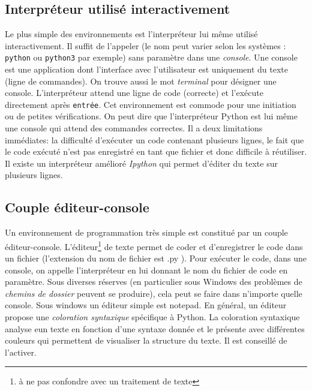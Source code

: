 \subsection{Interpréteur utilisé interactivement}
Le plus simple des environnements est l'interpréteur lui même utilisé interactivement. Il suffit de l'appeler (le nom peut varier selon les systèmes : \texttt{python} ou \texttt{python3} par exemple) sans paramètre dans une \emph{console}. Une console est une application dont l'interface avec l'utilisateur est uniquement du texte (ligne de commandes). On trouve aussi le mot \emph{terminal} pour désigner une console.\newline
L'interpréteur attend une ligne de code (correcte) et l'exécute directement après \texttt{entrée}. Cet environnement est commode pour une initiation ou de petites vérifications. 
On peut dire que l'interpréteur Python est lui même une console qui attend des commandes correctes.
Il a deux limitations immédiates: la difficulté d'exécuter un code contenant plusieurs lignes, le fait que le code exécuté n'est pas enregistré en tant que fichier et donc difficile à réutiliser. Il existe un interpréteur amélioré \emph{Ipython} qui permet d'éditer du texte sur plusieurs lignes.

\subsection{Couple éditeur-console}
Un environnement de programmation très simple est constitué par un couple éditeur-console.\newline
L'éditeur\footnote{à ne pas confondre avec un traitement de texte} de texte   permet de coder et d'enregistrer le code dans un fichier (l'extension du nom de fichier est .py ).\newline
Pour exécuter le code, dans une console, on appelle l'interpréteur en lui donnant le nom du fichier de code en paramètre.\newline
Sous diverses réserves (en particulier sous Windows des problèmes de \emph{chemins de dossier} peuvent se produire), cela peut se faire dans n'importe quelle console. Sous windows un éditeur simple est notepad. En général, un éditeur propose une \emph{coloration syntaxique}  spécifique à Python. La coloration syntaxique analyse eun texte en fonction d'une syntaxe donnée et le présente avec différentes couleurs qui permettent de visualiser la structure du texte. Il est conseillé de l'activer.

